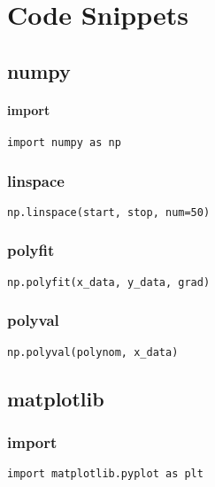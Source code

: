 \section{Code Snippets}

\subsection{numpy}

\paragraph{import}

\begin{verbatim}
import numpy as np
\end{verbatim}

\subsubsection{linspace}

\begin{verbatim}
np.linspace(start, stop, num=50)
\end{verbatim}

\subsubsection{polyfit}

\begin{verbatim}
np.polyfit(x_data, y_data, grad)
\end{verbatim}

\subsubsection{polyval}

\begin{verbatim}
np.polyval(polynom, x_data)
\end{verbatim}

\subsection{matplotlib}

\subsubsection{import}

\begin{verbatim}
import matplotlib.pyplot as plt
\end{verbatim}

